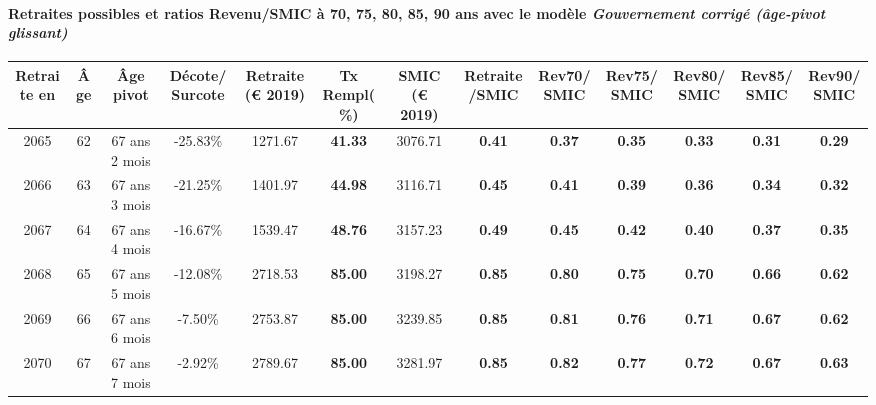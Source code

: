 \paragraph{Retraites possibles et ratios Revenu/SMIC à 70, 75, 80, 85, 90 ans avec le modèle \emph{Gouvernement corrigé (âge-pivot glissant)}}  
 
{ \scriptsize \begin{center} 
\begin{tabular}[htb]{|c|c||c|c||c|c||c||c|c|c|c|c|c|} 
\hline 
 Retraite en &  Âge &  Âge pivot &  Décote/Surcote &  Retraite (\euro{} 2019) &  Tx Rempl(\%) &  SMIC (\euro{} 2019) &  Retraite/SMIC &  Rev70/SMIC &  Rev75/SMIC &  Rev80/SMIC &  Rev85/SMIC &  Rev90/SMIC \\ 
\hline \hline 
 2065 &  62 &  67 ans 2 mois &  -25.83\% &  1271.67 &  {\bf 41.33} &  3076.71 &  {\bf {\color{red} 0.41}} &  {\bf {\color{red} 0.37}} &  {\bf {\color{red} 0.35}} &  {\bf {\color{red} 0.33}} &  {\bf {\color{red} 0.31}} &  {\bf {\color{red} 0.29}} \\ 
\hline 
 2066 &  63 &  67 ans 3 mois &  -21.25\% &  1401.97 &  {\bf 44.98} &  3116.71 &  {\bf {\color{red} 0.45}} &  {\bf {\color{red} 0.41}} &  {\bf {\color{red} 0.39}} &  {\bf {\color{red} 0.36}} &  {\bf {\color{red} 0.34}} &  {\bf {\color{red} 0.32}} \\ 
\hline 
 2067 &  64 &  67 ans 4 mois &  -16.67\% &  1539.47 &  {\bf 48.76} &  3157.23 &  {\bf {\color{red} 0.49}} &  {\bf {\color{red} 0.45}} &  {\bf {\color{red} 0.42}} &  {\bf {\color{red} 0.40}} &  {\bf {\color{red} 0.37}} &  {\bf {\color{red} 0.35}} \\ 
\hline 
 2068 &  65 &  67 ans 5 mois &  -12.08\% &  2718.53 &  {\bf 85.00} &  3198.27 &  {\bf {\color{red} 0.85}} &  {\bf {\color{red} 0.80}} &  {\bf {\color{red} 0.75}} &  {\bf {\color{red} 0.70}} &  {\bf {\color{red} 0.66}} &  {\bf {\color{red} 0.62}} \\ 
\hline 
 2069 &  66 &  67 ans 6 mois &  -7.50\% &  2753.87 &  {\bf 85.00} &  3239.85 &  {\bf {\color{red} 0.85}} &  {\bf {\color{red} 0.81}} &  {\bf {\color{red} 0.76}} &  {\bf {\color{red} 0.71}} &  {\bf {\color{red} 0.67}} &  {\bf {\color{red} 0.62}} \\ 
\hline 
 2070 &  67 &  67 ans 7 mois &  -2.92\% &  2789.67 &  {\bf 85.00} &  3281.97 &  {\bf {\color{red} 0.85}} &  {\bf {\color{red} 0.82}} &  {\bf {\color{red} 0.77}} &  {\bf {\color{red} 0.72}} &  {\bf {\color{red} 0.67}} &  {\bf {\color{red} 0.63}} \\ 
\hline 
\hline 
\end{tabular} 
\end{center} } 
